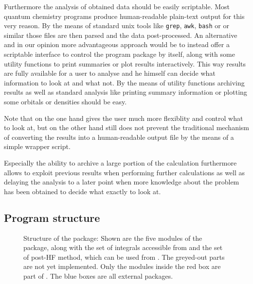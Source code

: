 Furthermore the analysis of obtained data should be easily scriptable.
Most quantum chemistry programs produce human-readable plain-text output
for this very reason.
By the means of standard unix tools like \texttt{grep}, \texttt{awk},
\texttt{bash} or \python or similar those files are then parsed and
the data post-processed.
An alternative and in our opinion more advantageous approach
would be to instead offer a scriptable interface to control
the program package by itself,
along with some utility functions to print summaries
or plot results interactively.
This way results are fully available for a user to analyse
and he himself can decide what information to look at
and what not.
By the means of utility functions
archiving results as well as standard analysis
like printing summary information or plotting some orbitals or densities
should be easy.

Note that on the one hand gives the user much more flexiblity and control
what to look at,
but on the other hand still does not prevent the traditional
mechanism of converting the results into a human-readable output file
by the means of a simple wrapper script.

Especially the ability to archive a large portion of the calculation
furthermore allows to exploit previous results when performing
further calculations as well as delaying the analysis
to a later point when \eg more knowledge about the
problem has been obtained to decide what exactly to look at.
%
%



\subsection{Program structure}
\label{sec:program-structure}


\begin{figure}
	\caption{Structure of the \molsturm package: Shown are the five modules of the package,
	along with the set of integrals accessible from \gint and the set of post-HF method,
	which can be used from \molsturm. The greyed-out parts are not yet implemented.
	Only the modules inside the red box are part of \molsturm. The blue boxes are all external packages.}
	\label{fig:structure}
\end{figure}

%
% 
%

